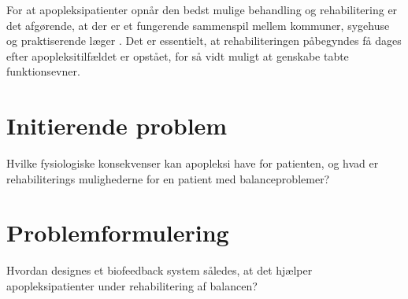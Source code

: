 For at apopleksipatienter opnår den bedst mulige behandling og rehabilitering er det afgørende, at der er et fungerende sammenspil mellem kommuner, sygehuse og praktiserende læger \cite{Sundhedsstyrelsen2010}. Det er essentielt, at rehabiliteringen påbegyndes få dages efter apopleksitilfældet er opstået, for så vidt muligt at genskabe tabte funktionsevner. \cite{Kruuse2015}

\section{Initierende problem}
Hvilke fysiologiske konsekvenser kan apopleksi have for patienten, og hvad er rehabiliterings mulighederne for en patient med balanceproblemer?  

\section{Problemformulering}
Hvordan designes et biofeedback system således, at det hjælper apopleksipatienter under rehabilitering af balancen?